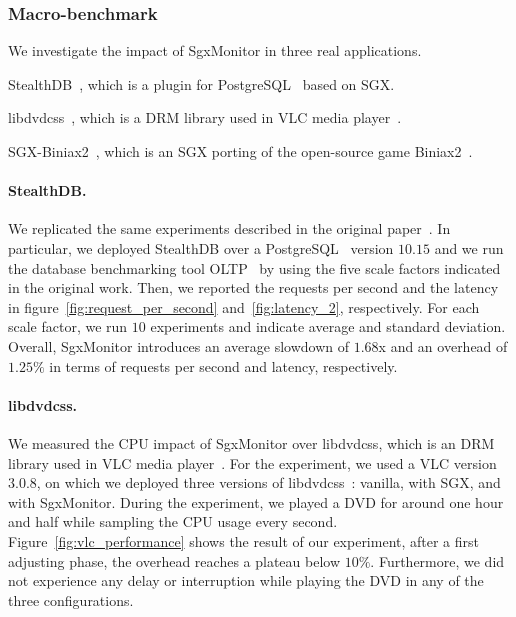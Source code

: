 \subsubsection{Macro-benchmark}
\label{sssec:macro-benchmar}

We investigate the impact of SgxMonitor in three real applications.
\begin{enumerate*}[label=(A\arabic*)]
	\item \textsf{StealthDB}~\citep{stealthdb}, which is a plugin for 
	PostgreSQL~\citep{momjian2001postgresql} based on SGX.
	\item \textsf{libdvdcss}~\citep{libdvdcss}, which is a DRM library used in 
	VLC media player~\citep{videolan}.
	\item \textsf{SGX-Biniax2}~\citep{bauman2016case}, which is an SGX porting 
	of the open-source game Biniax2~\citep{biniax2}.
\end{enumerate*}

\paragraph{StealthDB.}
We replicated the same experiments described in the 
original paper~\citep{stealthdb}. 
In particular, we deployed \textsf{StealthDB} over a 
PostgreSQL~\citep{momjian2001postgresql} version $10.15$ 
and we run the database benchmarking tool OLTP~\citep{oltp} by using the
five scale factors indicated in the original work.
Then, we reported the requests per second and the latency in 
figure~\ref{fig:request_per_second} and~\ref{fig:latency_2}, respectively.
For each scale factor, we run $10$ experiments and indicate average and 
standard deviation.
Overall, SgxMonitor introduces an average slowdown of $1.68$x and an 
overhead 
of $1.25\%$ in terms of requests per second and latency, respectively.

\paragraph{libdvdcss.}
We measured the CPU impact of SgxMonitor over \textsf{libdvdcss}, which is 
an 
DRM library used in VLC media player~\citep{videolan}.
For the experiment, we used a VLC version $3.0.8$, on which we deployed three 
versions of \textsf{libdvdcss}~\citep{libdvdcss}: vanilla, with SGX, and with 
SgxMonitor.
During the experiment, we played a DVD for around one hour and half while 
sampling the CPU usage every second.
Figure~\ref{fig:vlc_performance} shows the result of our experiment, after a 
first adjusting phase, the overhead reaches a plateau below $10\%$.
Furthermore, we did not experience any delay or interruption while playing the 
DVD in any of the three configurations.

